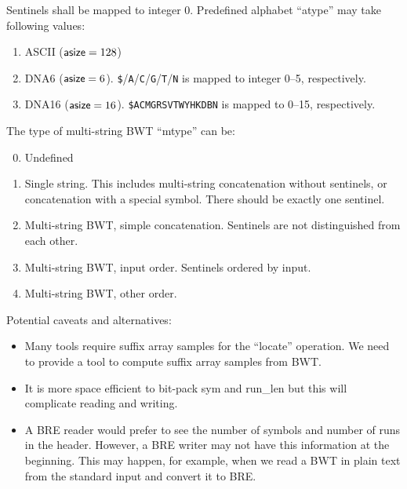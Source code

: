 \documentclass[10pt]{article}
\begin{document}
{\small
Sentinels shall be mapped to integer 0.
Predefined alphabet ``{\sf atype}'' may take following values:
\begin{enumerate}
\item {\sf ASCII} (${\sf asize}=128$)
\item {\sf DNA6} (${\sf asize}=6$). {\tt \$}/{\tt A}/{\tt C}/{\tt G}/{\tt T}/{\tt N} is mapped to integer 0--5, respectively.
\item {\sf DNA16} (${\sf asize}=16$). {\tt \$ACMGRSVTWYHKDBN} is mapped to 0--15, respectively.
\end{enumerate}

The type of multi-string BWT ``{\sf mtype}'' can be:
\begin{enumerate}
\setcounter{enumi}{-1}
\item Undefined
\item Single string. This includes multi-string concatenation without sentinels, or concatenation with a special symbol.
  There should be exactly one sentinel.
\item Multi-string BWT, simple concatenation. Sentinels are not distinguished from each other.
\item Multi-string BWT, input order. Sentinels ordered by input.
\item Multi-string BWT, other order.
\end{enumerate}

Potential caveats and alternatives:
\begin{itemize}
\item Many tools require suffix array samples for the ``locate'' operation.
  We need to provide a tool to compute suffix array samples from BWT.
\item It is more space efficient to bit-pack {\sf sym} and {\sf run\_len} but this will complicate reading and writing.
\item A BRE reader would prefer to see the number of symbols and number of runs in the header.
  However, a BRE writer may not have this information at the beginning.
  This may happen, for example, when we read a BWT in plain text from the standard input and convert it to BRE.
\end{itemize}
}
\end{document}

